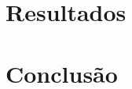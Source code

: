 \documentclass[12pt]{article}
\begin{document}
\section{Resultados}\label{sec:resultados}
\section{Conclusão}\label{sec:conclusao}




\end{document}
